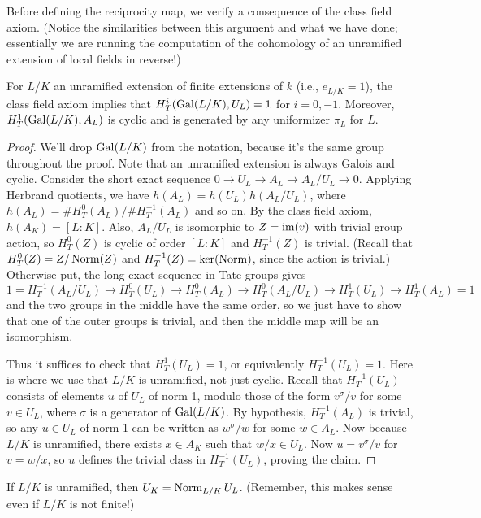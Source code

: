 Before defining the reciprocity map, we verify a consequence of the class
field axiom. (Notice the similarities between this argument and what we
have done; essentially we are running the computation of the cohomology
of an unramified extension of local fields in reverse!)
\begin{prop}
For $L/K$ an unramified extension of finite extensions of $k$
(i.e., $e_{L/K} = 1$), the class field axiom implies that
$H^i_T(\operatorname{Gal}(L/K), U_L) = 1$ for $i=0, -1$. Moreover,
$H^1_T(\operatorname{Gal}(L/K), A_L)$ is cyclic and is generated by any
uniformizer $\pi_L$ for $L$.
\end{prop}
\begin{proof}
We'll drop $\operatorname{Gal}(L/K)$ from the notation, because it's the same group
throughout the proof.
Note that an unramified extension is always Galois and cyclic.
Consider the short exact sequence $0 \to U_L \to A_L \to A_L/U_L \to 0$.
Applying Herbrand quotients, we have $h(A_L) = h(U_L) h(A_L/U_L)$,
where $h(A_L) = \#H^0_T(A_L)/\#H^{-1}_T(A_L)$ and so on. By
the class field axiom, $h(A_K) = [L:K]$. Also, $A_L/U_L$ is isomorphic
to $Z = \operatorname{im}(v)$ with trivial group action, so $H^0_T(Z)$ is cyclic
of order $[L:K]$ and $H^{-1}_T(Z)$ is trivial. (Recall
that $H^0_T(Z) = Z/\operatorname{Norm}(Z)$ and $H^{-1}_T(Z) = \ker(\operatorname{Norm})$,
since the action is trivial.)
Otherwise put, the long exact sequence in Tate groups gives
\[
1 = H^{-1}_T(A_L/U_L) \to
H^{0}_T(U_L) \to H^{0}_T(A_L) \to H^{0}_T(A_L/U_L)
\to H^{1}_T(U_L) \to H^1_T(A_L) = 1
\]
and the two groups in the middle have the same order, so we just have
to show that one of the outer groups is trivial, and then the middle
map will be an isomorphism.

Thus it suffices to check that $H^{1}_T(U_L) = 1$,
or equivalently $H^{-1}_T(U_L) = 1$.
Here is where we use that $L/K$ is unramified, not just cyclic.
Recall that $H^{-1}_T(U_L)$ consists of elements
$u$ of $U_L$ of norm 1, modulo those of the form $v^\sigma/v$ for some
$v \in U_L$, where $\sigma$ is a generator of $\operatorname{Gal}(L/K)$.
By hypothesis, $H^{-1}_T(A_L)$ is trivial,
so any $u \in U_L$ of norm 1 can be written as $w^\sigma/w$ for some
$w \in A_L$. Now because $L/K$ is unramified, there exists
$x \in A_K$ such that $w/x \in U_L$. Now $u = v^\sigma/v$ for
$v = w/x$, so $u$ defines the trivial class in $H^{-1}_T(U_L)$, proving the claim.
\end{proof}
\begin{cor} \label{C:abstract unramified}
  If $L/K$ is unramified, then $U_K = \operatorname{Norm}_{L/K} U_L$.
(Remember, this makes sense even if $L/K$ is not finite!)
\end{cor}


